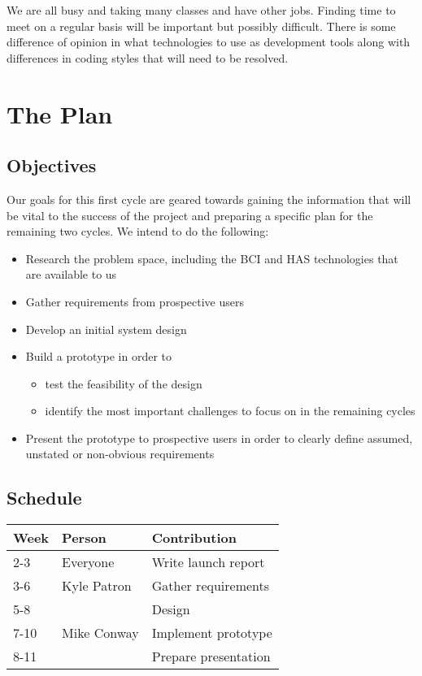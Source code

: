 \documentclass{report}
\begin{document}
We are all busy and taking many classes and have other jobs. Finding time to
meet on a regular basis will be important but possibly difficult. There is
some difference of opinion in what technologies to use as development tools
along with differences in coding styles that will need to be resolved. 

\newpage
\section*{\centering The Plan}

\subsection*{Objectives}

Our goals for this first cycle are geared towards gaining the information that
will be vital to the success of the project and preparing a specific plan for
the remaining two cycles. We intend to do the following:
\begin{itemize}
    \item Research the problem space, including the BCI and HAS technologies
        that are available to us
    \item Gather requirements from prospective users
    \item Develop an initial system design
    \item Build a prototype in order to
        \begin{itemize}
            \item test the feasibility of the design
            \item identify the most important challenges to focus on in the
                remaining cycles
        \end{itemize}
    \item Present the prototype to prospective users in order to clearly
        define assumed, unstated or non-obvious requirements
\end{itemize}

\subsection*{Schedule}

\begin{tabular}{| l | l | l |}
    \hline
    Week & Person & Contribution \\
    \hline \hline
    2-3 & Everyone & Write launch report \\ \hline
    3-6 & Kyle Patron & Gather requirements \\ \hline
    5-8 & & Design \\ \hline
    7-10 & Mike Conway & Implement prototype \\ \hline
    8-11 & & Prepare presentation \\ \hline
\end{tabular}
\end{document}
